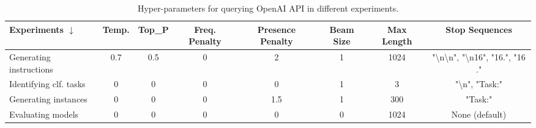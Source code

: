 \setlength\tabcolsep{2 pt} %
\begin{table}[h]
\centering
\small
\begin{tabular}{|l|c|c|c|c|c|c|c|}
\toprule
  Experiments $\downarrow$                               & Temp. & Top\_P & Freq. Penalty & Presence Penalty & Beam Size & Max Length & Stop Sequences                                                             \\ \midrule
Generating instructions          & 0.7        & 0.5    & 0                 & 2                & 1         & 1024                  & "\textbackslash{}n\textbackslash{}n", "\textbackslash{}n16", "16.", "16 ." \\
Identifying clf. tasks & 0           & 0      & 0                 & 0                & 1         & 3                     & "\textbackslash{}n", "Task:"                                               \\
Generating instances             & 0           & 0      & 0                 & 1.5              & 1         & 300                   & "Task:"                                                                    \\
Evaluating models    & 0           & 0      & 0                 & 0                & 0         & 1024                  & None (default) \\
\bottomrule
\end{tabular}
    \caption{Hyper-parameters for querying OpenAI API in different experiments.}
    \label{tab:query-gpt3-parameters}
\end{table}
